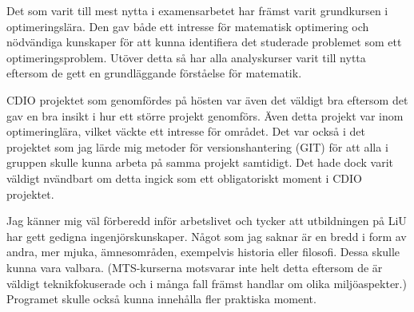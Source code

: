 \documentclass{article}
\begin{document}
Det som varit till mest nytta i examensarbetet har främst varit grundkursen i optimeringslära. Den gav både ett intresse för matematisk optimering och nödvändiga kunskaper för att kunna identifiera det studerade problemet som ett optimeringsproblem. Utöver detta så har alla analyskurser varit till nytta eftersom de gett en grundläggande förståelse för matematik. 

CDIO projektet som genomfördes på hösten var även det väldigt bra eftersom det gav en bra insikt i hur ett större projekt genomförs. Även detta projekt var inom optimeringlära, vilket väckte ett intresse för området. Det var också i det projektet som jag lärde mig metoder för versionshantering (GIT) för att alla i gruppen skulle kunna arbeta på samma projekt samtidigt. Det hade dock varit väldigt nvändbart om detta ingick som ett obligatoriskt moment i CDIO projektet. 

Jag känner mig väl förberedd inför arbetslivet och tycker att utbildningen på LiU har gett gedigna ingenjörskunskaper. Något som jag saknar är en bredd i form av andra, mer mjuka, ämnesområden, exempelvis historia eller filosofi. Dessa skulle kunna vara valbara. (MTS-kurserna motsvarar inte helt detta eftersom de är väldigt teknikfokuserade och i många fall främst handlar om olika miljöaspekter.) Programet skulle också kunna innehålla fler praktiska moment. 
\end{document}
